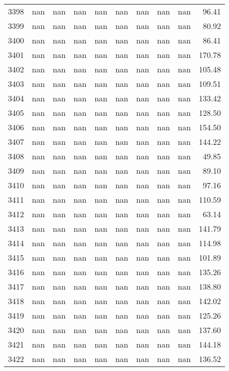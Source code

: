 \begin{tabular}{lrrrrrrrrr}
3398 & nan & nan & nan & nan & nan & nan & nan & nan & 96.41 \\
3399 & nan & nan & nan & nan & nan & nan & nan & nan & 80.92 \\
3400 & nan & nan & nan & nan & nan & nan & nan & nan & 86.41 \\
3401 & nan & nan & nan & nan & nan & nan & nan & nan & 170.78 \\
3402 & nan & nan & nan & nan & nan & nan & nan & nan & 105.48 \\
3403 & nan & nan & nan & nan & nan & nan & nan & nan & 109.51 \\
3404 & nan & nan & nan & nan & nan & nan & nan & nan & 133.42 \\
3405 & nan & nan & nan & nan & nan & nan & nan & nan & 128.50 \\
3406 & nan & nan & nan & nan & nan & nan & nan & nan & 154.50 \\
3407 & nan & nan & nan & nan & nan & nan & nan & nan & 144.22 \\
3408 & nan & nan & nan & nan & nan & nan & nan & nan & 49.85 \\
3409 & nan & nan & nan & nan & nan & nan & nan & nan & 89.10 \\
3410 & nan & nan & nan & nan & nan & nan & nan & nan & 97.16 \\
3411 & nan & nan & nan & nan & nan & nan & nan & nan & 110.59 \\
3412 & nan & nan & nan & nan & nan & nan & nan & nan & 63.14 \\
3413 & nan & nan & nan & nan & nan & nan & nan & nan & 141.79 \\
3414 & nan & nan & nan & nan & nan & nan & nan & nan & 114.98 \\
3415 & nan & nan & nan & nan & nan & nan & nan & nan & 101.89 \\
3416 & nan & nan & nan & nan & nan & nan & nan & nan & 135.26 \\
3417 & nan & nan & nan & nan & nan & nan & nan & nan & 138.80 \\
3418 & nan & nan & nan & nan & nan & nan & nan & nan & 142.02 \\
3419 & nan & nan & nan & nan & nan & nan & nan & nan & 125.26 \\
3420 & nan & nan & nan & nan & nan & nan & nan & nan & 137.60 \\
3421 & nan & nan & nan & nan & nan & nan & nan & nan & 144.18 \\
3422 & nan & nan & nan & nan & nan & nan & nan & nan & 136.52 \\

\end{tabular}
